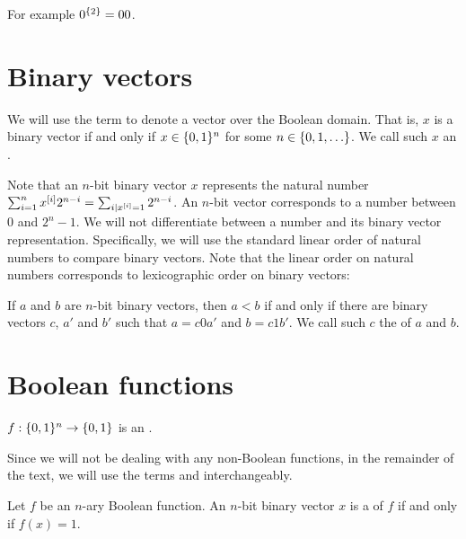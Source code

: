 For example
$0^{\{2\}} = 00$.

\section{Binary vectors}

\begin{definition}
We will use the term 
to denote a vector over the Boolean domain.
That is, $x$ is a binary vector if and only if
$x \in \{0, 1\}^n$ for some $n \in \{0, 1, \ldots\}$.
We call such $x$ an .
\end{definition}

Note that an $n$-bit binary vector $x$
represents the natural number
$\sum_{i = 1}^n x^{[i]} 2^{n-i}
= \sum_{i|x^{[i]}=1} 2^{n-i}$.
An $n$-bit vector
corresponds to a number between $0$ and $2^n - 1$.
We will not differentiate between a number
and its binary vector representation.
Specifically,
we will use the standard linear order of natural numbers
to compare binary vectors.
Note that the linear order on natural numbers
corresponds to lexicographic order
on binary vectors:
\begin{observation}
\label{observation:lexicographicorder}
If $a$ and $b$ are $n$-bit binary vectors,
then $a < b$
if and only if
there are binary vectors $c$,
$a'$ and $b'$
such that
$a = c 0 a'$ and $b = c 1 b'$.
We call such $c$ the 
of $a$ and $b$.
\end{observation}

\section{Boolean functions}

\begin{definition}
$f: \{0, 1\}^n \rightarrow \{0, 1\}$ is
an .
\end{definition}

Since we will not be dealing with any non-Boolean functions,
in the remainder of the text,
we will use the terms
 and 
interchangeably.

\begin{definition}
Let $f$ be an $n$-ary Boolean function.
An $n$-bit binary vector $x$ is a 
of $f$ if and only if $f(x)  = 1$.
\end{definition}

